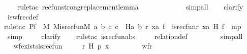 \begin{isabellebody}
\ \ \ \isamarkupfalse%
{\isacharparenleft}{\kern0pt}rule{\isacharunderscore}{\kern0pt}tac\ recfun{\isacharunderscore}{\kern0pt}strong{\isacharunderscore}{\kern0pt}replacement{\isacharunderscore}{\kern0pt}lemma{\isacharparenright}{\kern0pt}\ \isanewline
\ \ \ \ \ \ \ \ \ \ \isamarkupfalse%
\ simp{\isacharunderscore}{\kern0pt}all\isanewline
\ \ \isamarkupfalse%
\ clarify\ \isanewline
\ \ \isamarkupfalse%
\ is{\isacharunderscore}{\kern0pt}wfrec{\isacharunderscore}{\kern0pt}def\ \isanewline
\ \ \isamarkupfalse%
{\isacharparenleft}{\kern0pt}rule{\isacharunderscore}{\kern0pt}tac\ P{\isacharequal}{\kern0pt}{\isachardoublequoteopen}{\isasymforall}f\ {\isasymin}\ M{\isachardot}{\kern0pt}\ M{\isacharunderscore}{\kern0pt}is{\isacharunderscore}{\kern0pt}recfun{\isacharparenleft}{\kern0pt}{\isacharhash}{\kern0pt}{\isacharhash}{\kern0pt}M{\isacharcomma}{\kern0pt}\ {\isasymlambda}a\ b\ c{\isachardot}{\kern0pt}\ c\ {\isacharequal}{\kern0pt}\ H{\isacharparenleft}{\kern0pt}a{\isacharcomma}{\kern0pt}\ b{\isacharparenright}{\kern0pt}{\isacharcomma}{\kern0pt}\ r{\isacharcomma}{\kern0pt}\ xa{\isacharcomma}{\kern0pt}\ f{\isacharparenright}{\kern0pt}\ {\isasymlongleftrightarrow}\ is{\isacharunderscore}{\kern0pt}recfun{\isacharparenleft}{\kern0pt}r{\isacharcomma}{\kern0pt}\ xa{\isacharcomma}{\kern0pt}\ H{\isacharcomma}{\kern0pt}\ f{\isacharparenright}{\kern0pt}{\isachardoublequoteclose}\ \ mp{\isacharparenright}{\kern0pt}\ \isanewline
\ \ \ \isamarkupfalse%
\ simp\ \isanewline
\ \ \isamarkupfalse%
\ clarify\ \isanewline
\ \ \isamarkupfalse%
{\isacharparenleft}{\kern0pt}rule{\isacharunderscore}{\kern0pt}tac\ is{\isacharunderscore}{\kern0pt}recfun{\isacharunderscore}{\kern0pt}abs{\isacharparenright}{\kern0pt}\ \isanewline
\ \ \isamarkupfalse%
\ relation{}{\isacharunderscore}{\kern0pt}def\ \isanewline
\ \ \ \ \ \ \isamarkupfalse%
\ simp{\isacharunderscore}{\kern0pt}all\ \isanewline
\ \ \isamarkupfalse%
%
\endisatagproof
{\isafoldproof}%
%
\isadelimproof
\ \isanewline
%
\endisadelimproof
\isanewline
{}\isamarkupfalse%
\ wf{\isacharunderscore}{\kern0pt}exists{\isacharunderscore}{\kern0pt}is{\isacharunderscore}{\kern0pt}recfun{\isacharprime}{\kern0pt}\ {\isacharcolon}{\kern0pt}\ \isanewline
\ \ \ r\ H\ p\ x\ \isanewline
\ \ \ \isanewline
\ \ \ \ {\isachardoublequoteopen}wf{\isacharparenleft}{\kern0pt}r{\isacharparenright}{\kern0pt}{\isachardoublequoteclose}\ \isanewline

\end{isabellebody}
